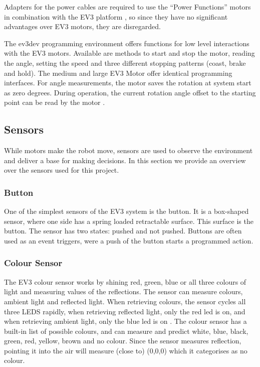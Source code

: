 \documentclass[11pt, a4paper]{article}
\begin{document}
	Adapters for the power cables are required to use the ``Power Functions'' motors in combination with the EV3 platform \cite{power_fun}, so since they have no significant advantages over EV3 motors, they are disregarded.
	\medskip
	
	The ev3dev programming environment offers functions for low level interactions with the EV3 motors. Available are methods to start and stop the motor, reading the angle, setting the speed and three different stopping patterns (coast, brake and hold). The medium and large EV3 Motor offer identical programming interfaces. For angle measurements, the motor saves the rotation at system start as zero degrees. During operation, the current rotation angle offset to the starting point can be read by the motor \cite{ev3_python}.
	
	\subsection{Sensors}
	While motors make the robot move, sensors are used to observe the environment and deliver a base for making decisions. In this section we provide an overview over the sensors used for this project.
	
	\subsubsection*{Button}
	One of the simplest sensors of the EV3 system is the button. It is a box-shaped sensor, where one side has a spring loaded retractable surface. This surface is the button. The sensor has two states: pushed and not pushed. Buttons are often used as an event triggers, were a push of the button starts a programmed action.
	
	\subsubsection*{Colour Sensor}
	The EV3 colour sensor works by shining red, green, blue or all three colours of light and measuring values of the reflections. The sensor can measure colours, ambient light and reflected light. When retrieving colours, the sensor cycles all three LEDS rapidly, when retrieving reflected light, only the red led is on, and when retrieving ambient light, only the blue led is on \cite{colour_sensor_python}. The colour sensor has a built-in list of possible colours, and can measure and predict white, blue, black, green, red, yellow, brown and no colour. Since the sensor measures reflection, pointing it into the air will measure (close to) (0,0,0) which it categorises as no colour.
	
\end{document}
